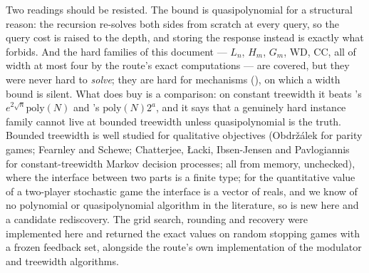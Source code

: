 \documentclass[11pt]{article}
\theoremstyle{plain}
\theoremstyle{definition}
\begin{document}
Two readings should be resisted. The bound is quasipolynomial for a
structural reason: the recursion re-solves both sides from scratch at
every query, so the query cost is raised to the depth, and storing the
response instead is exactly what  forbids. And the
hard families of this document --- $L_n$, $H_m$, $G_m$, $\mathrm{WD}$,
$\mathrm{CC}$, all of width at most four by the route's exact
computations --- are covered, but they were never hard to \emph{solve};
they are hard for mechanisms (), on which a width bound is
silent. What  does buy is a comparison: on constant
treewidth it beats 's $e^{2\sqrt n}\mathrm{poly}(N)$
and 's $\mathrm{poly}(N)2^{a}$, and it says that a
genuinely hard instance family cannot live at bounded treewidth unless
quasipolynomial is the truth. Bounded treewidth is well studied for
qualitative objectives (Obdr\v{z}\'alek for parity games; Fearnley and
Schewe; Chatterjee, {\L}acki, Ibsen-Jensen and Pavlogiannis for
constant-treewidth Markov decision processes; all from memory,
unchecked), where the interface between two parts is a finite type; for
the quantitative value of a two-player stochastic game the interface is
a vector of reals, and we know of no polynomial or quasipolynomial
algorithm in the literature, so  is new here and a candidate
rediscovery. The grid search, rounding and recovery were implemented here
and returned the exact values on random stopping games with a frozen
feedback set, alongside the route's own implementation of the modulator
and treewidth algorithms.
\end{document}

